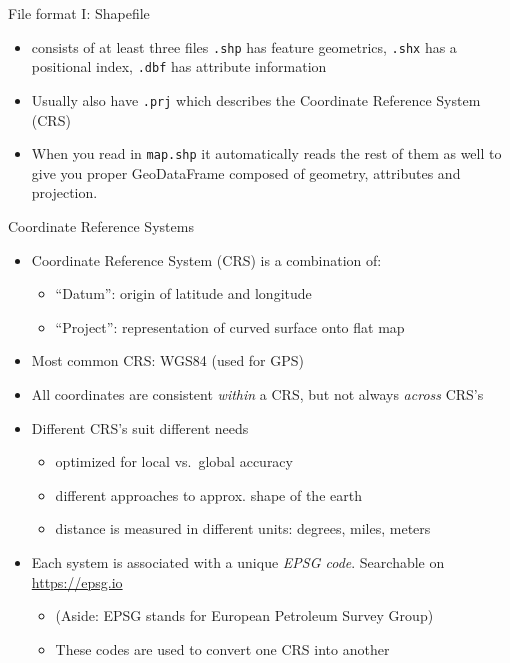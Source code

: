 \documentclass[
  ignorenonframetext,
]{beamer}
\providecommand{\tightlist}{%
  \setlength{\itemsep}{0pt}\setlength{\parskip}{0pt}}\usepackage{longtable,booktabs,array}
\begin{document}
\begin{frame}[fragile]{File format I: Shapefile}
\label{file-format-i-shapefile}
\begin{itemize}
\tightlist
\item
  consists of at least three files \texttt{.shp} has feature geometrics,
  \texttt{.shx} has a positional index, \texttt{.dbf} has attribute
  information
\item
  Usually also have \texttt{.prj} which describes the Coordinate
  Reference System (CRS)
\item
  When you read in \texttt{map.shp} it automatically reads the rest of
  them as well to give you proper GeoDataFrame composed of geometry,
  attributes and projection.
\end{itemize}
\end{frame}

\begin{frame}{Coordinate Reference Systems}
\label{coordinate-reference-systems}
\begin{itemize}
\tightlist
\item
  Coordinate Reference System (CRS) is a combination of:

  \begin{itemize}
  \tightlist
  \item
    ``Datum'': origin of latitude and longitude
  \item
    ``Project'': representation of curved surface onto flat map
  \end{itemize}
\item
  Most common CRS: WGS84 (used for GPS)
\item
  All coordinates are consistent \emph{within} a CRS, but not always
  \emph{across} CRS's
\item
  Different CRS's suit different needs

  \begin{itemize}
  \tightlist
  \item
    optimized for local vs.~global accuracy
  \item
    different approaches to approx. shape of the earth
  \item
    distance is measured in different units: degrees, miles, meters
  \end{itemize}
\item
  Each system is associated with a unique \emph{EPSG code}. Searchable
  on \url{https://epsg.io}

  \begin{itemize}
  \tightlist
  \item
    (Aside: EPSG stands for European Petroleum Survey Group)
  \item
    These codes are used to convert one CRS into another
  \end{itemize}
\end{itemize}
\end{frame}
\end{document}
